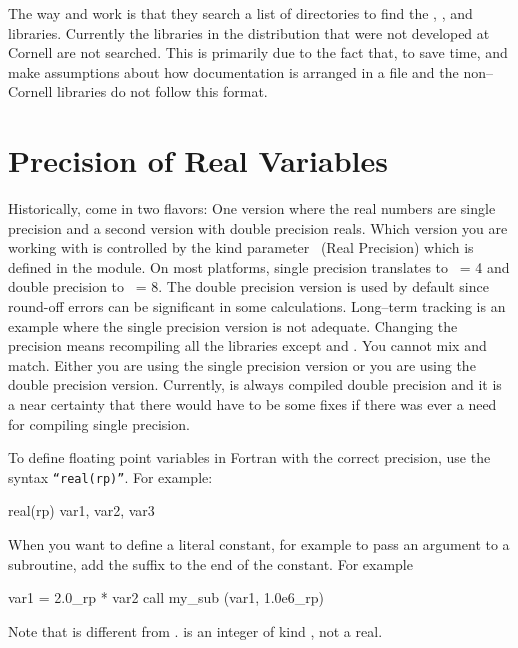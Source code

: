 The way  and  work is that they search a list of
directories to find the , , and 
libraries. Currently the libraries in the \bmad distribution that were
not developed at Cornell are not searched. This is primarily due to
the fact that, to save time,  and  make assumptions
about how documentation is arranged in a file and the non--Cornell libraries 
do not follow this format.

\section{Precision of Real Variables}
\label{s:precision}


Historically, \bmad come in two flavors: One version where the real
numbers are single precision and a second version with double
precision reals. Which version you are working with is controlled by
the kind parameter \ (Real Precision) which is defined in the
 module. On most platforms, single precision
translates to \ = 4 and double precision to \ = 8. The
double precision version is used by default since round-off errors can
be significant in some calculations. Long--term tracking is an example
where the single precision version is not adequate. Changing the
precision means recompiling all the libraries except  and
.  You cannot mix and match. Either you are using the
single precision version or you are using the double precision
version. Currently, \bmad is always compiled double precision and it
is a near certainty that there would have to be some fixes if there
was ever a need for compiling single precision.

To define floating point variables in Fortran with the correct precision,
 use the syntax {\tt ``real(rp)''}. For example:
\begin{example}
    real(rp) var1, var2, var3
\end{example}
When you want to define a literal constant, for example to pass an
argument to a subroutine, add the suffix  to the end of the
constant. For example
\begin{example}
   var1 =  2.0_rp * var2
   call my_sub (var1, 1.0e6_rp)
\end{example}
Note that  is different from .  is an
integer of kind , not a real.


